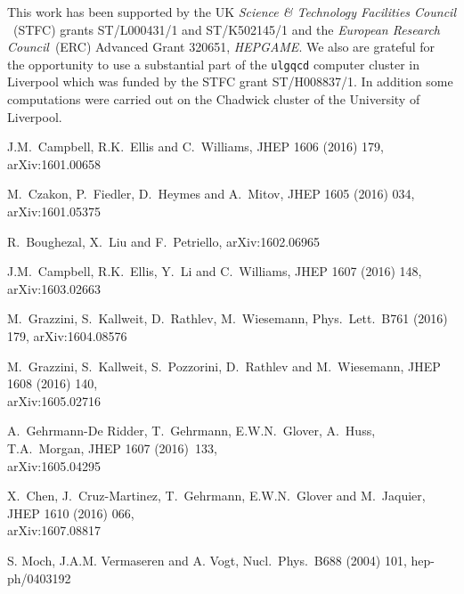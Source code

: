 \documentclass[12pt]{article}
\begin{document}
This work has been supported by the UK {\it Science \& Technology
Facilities Council}$\,$ (STFC) grants ST/L000431/1 and ST/K502145/1 and 
the {\it European Research Council}$\,$ (ERC) Advanced Grant 320651, 
{\it HEPGAME}. 
We also are grateful for the opportunity to use a substantial part of the 
{\tt ulgqcd} computer cluster in Liverpool which was funded by the 
STFC grant ST/H008837/1. 
In addition some computations were carried out on the Chadwick 
cluster of the University of Liverpool.


{\small
\setlength{\baselineskip}{0.4cm}

\begin{thebibliography}{99}

J.M.~Campbell, R.K.~Ellis and C.~Williams,
  JHEP 1606 (2016) 179, arXiv:1601.00658

M.~Czakon, P.~Fiedler, D.~Heymes and A.~Mitov,
  JHEP 1605 (2016) 034, arXiv:1601.05375
 
R.~Boughezal, X.~Liu and F.~Petriello,
  arXiv:1602.06965
 
J.M.~Campbell, R.K.~Ellis, Y.~Li and C.~Williams,
  JHEP 1607 (2016) 148, arXiv:1603.02663
 
M.~Grazzini, S.~Kallweit, D.~Rathlev, M.~Wiesemann,
  Phys.\ Lett.\ B761 (2016) 179, arXiv:1604.08576
 
M.~Grazzini, S.~Kallweit, S.~Pozzorini, D.~Rathlev and M.~Wiesemann,
  JHEP 1608 (2016) 140, \\[1mm] arXiv:1605.02716
 
A.~Gehrmann-De Ridder, T.~Gehrmann, E.W.N.~Glover, A.~Huss, T.A.~Morgan,
  JHEP 1607 (2016)~133,\\[1mm] arXiv:1605.04295

X.~Chen, J.~Cruz-Martinez, T.~Gehrmann, E.W.N.~Glover and M.~Jaquier,
  JHEP 1610 (2016) 066,\\[1mm] arXiv:1607.08817

S. Moch, J.A.M. Vermaseren and A. Vogt,
  Nucl.\ Phys.\ B688 (2004) 101, hep-ph/0403192


\end{thebibliography}}
\end{document}
